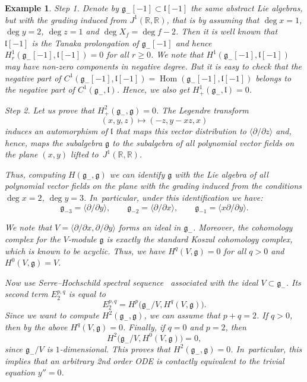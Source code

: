 \documentclass[10pt,a4paper]{amsart}
\newcommand{\R}{\mathbb R}
\newcommand{\g}{\mathfrak g}
\newcommand{\lf}{\mathfrak l}
\newcommand{\Hom}{\operatorname{Hom}}
\newtheorem{ex}[thm]{Example}
\numberwithin{equation}{section}
\begin{document}
\begin{ex}
{}
	
	\textit{Step} 1. Denote by $\g_{-}[-1]\subset \lf[-1]$ the same abstract Lie algebras, but with the gra\-ding induced from $J^1(\R,\R)$, that is by assuming that $\deg x = 1$, $\deg y= 2$, $\deg z= 1$ and $\deg X_f = \deg f - 2$. Then it is well known that $\lf[-1]$ is the Tanaka prolongation of $\g_{-}[-1]$ and hence $H^1_r\left(\g_{-}[-1],\lf[-1]\right)=0$ for all $r\ge 0$. We note that $H^1\left(\g_{-}[-1],\lf[-1]\right)$ may have non-zero components in negative degree. But it is easy to check that the negative part of $C^1\left(\g_{-}[-1],\lf[-1]\right)=\Hom\left(\g_{-}[-1],\lf[-1]\right)$ belongs to the negative part of $C^1(\g_{-},\lf)$. Hence, we also get $H^1_+(\g_{-},\lf)=0$.
	
	\textit{Step} 2. Let us prove that $H^2_{+}(\g_{-},\g)=0$. The Legendre transform
	\[
	(x,y,z) \mapsto (-z, y-xz, x)
	\]
	induces an automorphism of $\lf$ that maps this vector distribution to $\langle \partial/\partial z \rangle$ and, hence, maps the subalgebra $\g$ to the subalgebra of all polynomial vector fields on the plane $(x,y)$ lifted to~$J^1(\R,\R)$.
	
	Thus, computing $H(\g_{-},\g)$ we can identify $\g$ with the Lie algebra of all polynomial vector fields on the plane with the grading induced from the conditions $\deg x = 2$, $\deg y = 3$. In~particular, under this identification we have:
	\[
	\g_{-3} = \langle \partial/\partial y \rangle,\qquad
	\g_{-2} = \langle \partial/\partial x \rangle, \qquad
	\g_{-1} = \langle x\partial/\partial y \rangle.
	\]
	
	We note that $V = \langle \partial/\partial x, \partial/\partial y\rangle$ forms an ideal in $\g_{-}$. Moreover, the cohomology complex for the $V$-module $\g$ is exactly the standard Koszul cohomology complex, which is known to be acyclic. Thus, we have $H^q(V,\g)=0$ for all $q>0$ and $H^0(V,\g) = V$.
	
	Now use Serre--Hochschild spectral sequence~\cite{sh1953} associated with the ideal $V\subset \g_{-}$. Its second term $E_2^{p,q}$ is equal to
	\[
	E_2^{p,q} = H^p \big(\g_{-}/V, H^q(V,\g)\big).
	\]
	Since we want to compute $H^2(\g_{-},\g)$, we can assume that $p+q=2$. If $q>0$, then by the above $H^q(V,\g)=0$. Finally, if $q=0$ and $p=2$, then
	\[
	H^2 \big(\g_{-}/V, H^0(V,\g)\big) = 0,
	\]
	since $\g_{-}/V$ is $1$-dimensional. This proves that $H^2(\g_{-},\g)=0$. In~particular, this implies that an arbitrary 2nd order ODE is contactly
	equivalent to the trivial equation $y''=0$.
	

\end{ex}
\end{document}
